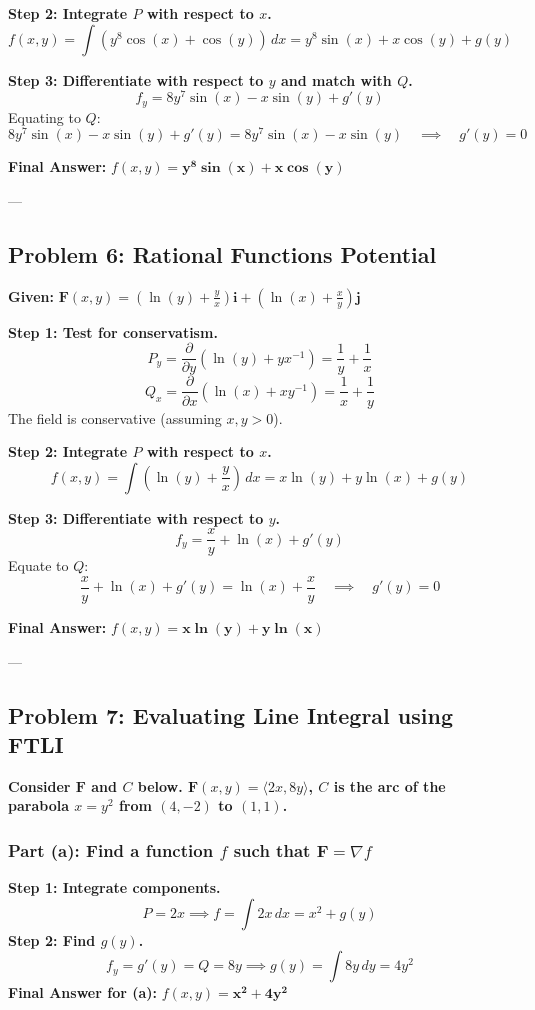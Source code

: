 \documentclass[12pt]{article}
\begin{document}
\textbf{Step 2: Integrate $P$ with respect to $x$.}
\[
f(x, y) = \int (y^8\cos(x) + \cos(y)) \, dx = y^8\sin(x) + x\cos(y) + g(y)
\]

\textbf{Step 3: Differentiate with respect to $y$ and match with $Q$.}
\[
f_y = 8y^7\sin(x) - x\sin(y) + g'(y)
\]
Equating to $Q$:
\[
8y^7\sin(x) - x\sin(y) + g'(y) = 8y^7\sin(x) - x\sin(y) \quad \implies \quad g'(y) = 0
\]

\textbf{Final Answer:} $f(x, y) = \mathbf{y^8\sin(x) + x\cos(y)}$

---

\subsection{Problem 6: Rational Functions Potential}
\textbf{Given:} $\mathbf{F}(x, y) = \left(\ln(y) + \frac{y}{x}\right)\mathbf{i} + \left(\ln(x) + \frac{x}{y}\right)\mathbf{j}$

\textbf{Step 1: Test for conservatism.}
\[
P_y = \frac{\partial}{\partial y}\left(\ln(y) + yx^{-1}\right) = \frac{1}{y} + \frac{1}{x}
\]
\[
Q_x = \frac{\partial}{\partial x}\left(\ln(x) + xy^{-1}\right) = \frac{1}{x} + \frac{1}{y}
\]
The field is conservative (assuming $x, y > 0$).

\textbf{Step 2: Integrate $P$ with respect to $x$.}
\[
f(x, y) = \int \left(\ln(y) + \frac{y}{x}\right) \, dx = x\ln(y) + y\ln(x) + g(y)
\]

\textbf{Step 3: Differentiate with respect to $y$.}
\[
f_y = \frac{x}{y} + \ln(x) + g'(y)
\]
Equate to $Q$:
\[
\frac{x}{y} + \ln(x) + g'(y) = \ln(x) + \frac{x}{y} \quad \implies \quad g'(y) = 0
\]

\textbf{Final Answer:} $f(x, y) = \mathbf{x\ln(y) + y\ln(x)}$

---

\subsection{Problem 7: Evaluating Line Integral using FTLI}
\textbf{Consider $\mathbf{F}$ and $C$ below. $\mathbf{F}(x, y) = \langle 2x, 8y \rangle$, $C$ is the arc of the parabola $x = y^2$ from $(4, -2)$ to $(1, 1)$.}

\subsubsection*{Part (a): Find a function $f$ such that $\mathbf{F} = \nabla f$}
\textbf{Step 1: Integrate components.}
\[
P = 2x \implies f = \int 2x \, dx = x^2 + g(y)
\]
\textbf{Step 2: Find $g(y)$.}
\[
f_y = g'(y) = Q = 8y \implies g(y) = \int 8y \, dy = 4y^2
\]
\textbf{Final Answer for (a):} $f(x,y) = \mathbf{x^2 + 4y^2}$
\end{document}
